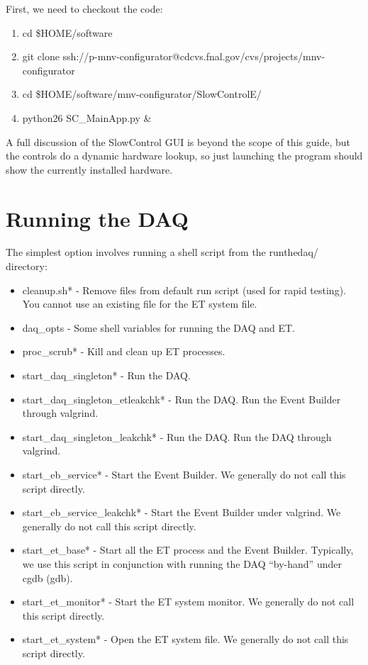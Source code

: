 First, we need to checkout the code:
\begin{enumerate}
\item cd \$HOME/software
\item git clone ssh://p-mnv-configurator@cdcvs.fnal.gov/cvs/projects/mnv-configurator
\item cd \$HOME/software/mnv-configurator/SlowControlE/
\item python26 SC\_MainApp.py \&
\end{enumerate}

A full discussion of the SlowControl GUI is beyond the scope of this guide, but the controls do a dynamic hardware lookup, so just launching the program should show the currently installed hardware.

\section{Running the DAQ}

The simplest option involves running a shell script from the runthedaq/ directory:

\begin{itemize}
\item cleanup.sh* - Remove files from default run script (used for rapid testing). You cannot use an existing file for the ET system file.
\item daq\_opts - Some shell variables for running the DAQ and ET.
\item proc\_scrub* - Kill and clean up ET processes.
\item start\_daq\_singleton* - Run the DAQ.
\item start\_daq\_singleton\_etleakchk* - Run the DAQ. Run the Event Builder through valgrind. 
\item start\_daq\_singleton\_leakchk* - Run the DAQ. Run the DAQ through valgrind.  
\item start\_eb\_service* - Start the Event Builder. We generally do not call this script directly.
\item start\_eb\_service\_leakchk* - Start the Event Builder under valgrind. We generally do not call this script directly.
\item start\_et\_base* - Start all the ET process and the Event Builder. Typically, we use this script in conjunction with running the DAQ ``by-hand'' under cgdb (gdb).
\item start\_et\_monitor* - Start the ET system monitor. We generally do not call this script directly.
\item start\_et\_system* - Open the ET system file. We generally do not call this script directly.
\end{itemize}

